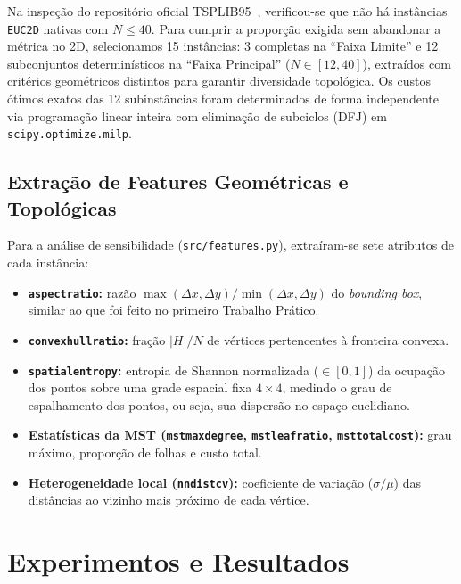 \documentclass[12pt,a4paper]{article}
\renewcommand{\_}{\origunderscore\hspace{0pt}}
\begin{document}
Na inspeção do repositório oficial TSPLIB95~\cite{reinelt1991}, verificou-se que não há instâncias \texttt{EUC\_2D} nativas com $N \le 40$. Para cumprir a proporção exigida sem abandonar a métrica no 2D, selecionamos 15 instâncias: 3 completas na ``Faixa Limite'' e 12 subconjuntos determinísticos na ``Faixa Principal'' ($N \in [12, 40]$), extraídos com critérios geométricos distintos para garantir diversidade topológica. Os custos ótimos exatos das 12 subinstâncias foram determinados de forma independente via programação linear inteira com eliminação de subciclos (DFJ) em \texttt{scipy.optimize.milp}.

\subsection{Extração de Features Geométricas e Topológicas}
Para a análise de sensibilidade (\texttt{src/features.py}), extraíram-se sete atributos de cada instância:
\begin{itemize}
    \item \textbf{\texttt{aspect\_ratio}:} razão $\max(\Delta x, \Delta y) / \min(\Delta x, \Delta y)$ do \textit{bounding box}, similar ao que foi feito no primeiro Trabalho Prático.
    \item \textbf{\texttt{convex\_hull\_ratio}:} fração $|H|/N$ de vértices pertencentes à fronteira convexa.
    \item \textbf{\texttt{spatial\_entropy}:} entropia de Shannon normalizada ($\in [0, 1]$) da ocupação dos pontos sobre uma grade espacial fixa $4 \times 4$, medindo o grau de espalhamento dos pontos, ou seja, sua dispersão no espaço euclidiano.
    \item \textbf{Estatísticas da MST (\texttt{mst\_max\_degree}, \texttt{mst\_leaf\_ratio}, \texttt{mst\_total\_cost}):} grau máximo, proporção de folhas e custo total.
    \item \textbf{Heterogeneidade local (\texttt{nn\_dist\_cv}):} coeficiente de variação ($\sigma / \mu$) das distâncias ao vizinho mais próximo de cada vértice.
\end{itemize}

\section{Experimentos e Resultados}
\end{document}
